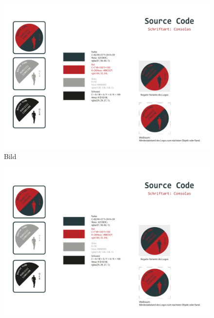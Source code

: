 \begin{figure}[H]
	\centering
	\includegraphics[width=.55\textwidth]{content/bsp/Logo-Details.pdf}
	\caption{Bild} \label{bild}
\end{figure}

\begin{figure}[H]
	\centering
	\includegraphics[width=.35\textwidth]{content/bsp/Logo-Details.pdf}
\end{figure}

